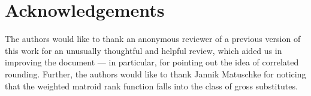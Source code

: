 \section*{Acknowledgements}
The authors would like to thank an anonymous reviewer of a previous version of this work for an unusually thoughtful and helpful review, which aided us in improving the document — in particular, for pointing out the idea of correlated rounding. Further, the authors would like to thank Jannik Matuschke for noticing that the weighted matroid rank function falls into the class of gross substitutes.